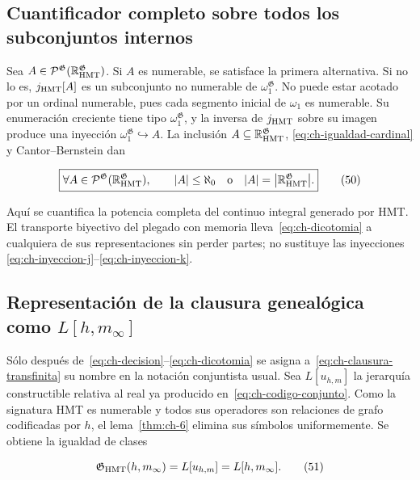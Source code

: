 \subsection{Cuantificador completo sobre todos los subconjuntos internos}

Sea
\(A\in\mathcal P^{\mathfrak G}
(\mathbb R_{\rm HMT}^{\mathfrak G})\). Si \(A\) es numerable, se satisface la
primera alternativa. Si no lo es, \(j_{\rm HMT}[A]\) es un subconjunto no
numerable de \(\omega_1^{\mathfrak G}\). No puede estar acotado por un ordinal
numerable, pues cada segmento inicial de \(\omega_1\) es numerable. Su
enumeración creciente tiene tipo \(\omega_1^{\mathfrak G}\), y la inversa de
\(j_{\rm HMT}\) sobre su imagen produce una inyección
\(\omega_1^{\mathfrak G}\hookrightarrow A\). La inclusión
\(A\subseteq\mathbb R_{\rm HMT}^{\mathfrak G}\), \eqref{eq:ch-igualdad-cardinal} y
Cantor--Bernstein dan

\[
 \boxed{
 \forall A\in\mathcal P^{\mathfrak G}
   (\mathbb R_{\rm HMT}^{\mathfrak G}),\qquad
 |A|\le\aleph_0
 \quad\text{o}\quad
 |A|=\bigl|\mathbb R_{\rm HMT}^{\mathfrak G}\bigr|.}
\tag{50}\label{eq:ch-dicotomia}
\]

Aquí se cuantifica la potencia completa del continuo integral generado por
HMT. El transporte biyectivo del plegado con memoria lleva~\eqref{eq:ch-dicotomia} a cualquiera
de sus representaciones sin perder partes; no sustituye las inyecciones
\eqref{eq:ch-inyeccion-j}--\eqref{eq:ch-inyeccion-k}.

\subsection{Representación de la clausura genealógica como \texorpdfstring{\(L[h,m_\infty]\)}{L[h,m-infinito]}}

Sólo después de~\eqref{eq:ch-decision}--\eqref{eq:ch-dicotomia} se asigna
a~\eqref{eq:ch-clausura-transfinita} su nombre en la notación
conjuntista usual. Sea \(L[u_{h,m}]\) la jerarquía constructible relativa al
real ya producido en~\eqref{eq:ch-codigo-conjunto}. Como la signatura HMT es numerable y todos sus
operadores son relaciones de grafo codificadas por \(h\), el lema~\ref{thm:ch-6} elimina
sus símbolos uniformemente. Se obtiene la igualdad de clases

\[
 \mathfrak G_{\rm HMT}(h,m_\infty)
 =L[u_{h,m}]=L[h,m_\infty].
\tag{51}\label{eq:ch-representacion-L}
\]

